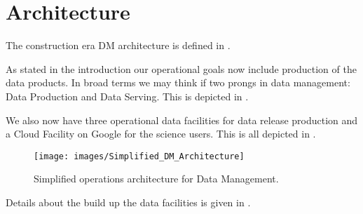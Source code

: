 \section{Architecture} \label{sec:arch}

The construction era DM architecture is defined in .

As stated in the introduction our operational goals now include production of the data products.
In broad terms we may think if two prongs in data management: Data Production and Data Serving.
This is depicted in .

We also now have three operational data facilities for data release production and a Cloud Facility on Google for the science users.
This is all depicted in .



\begin{figure}
\begin{centering}
\texttt{[image: images/Simplified\_DM\_Architecture]}
\caption{Simplified operations architecture for Data Management.\label{fig:simplearch}}
\end{centering}
\end{figure}

Details about the build up the data facilities is given in .
